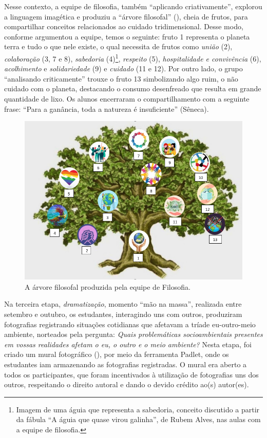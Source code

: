 Nesse contexto, a equipe de filosofia, também “aplicando criativamente”, explorou a linguagem imagética e produziu a “árvore filosofal” (), cheia de frutos, para compartilhar conceitos relacionados ao cuidado tridimensional. Desse modo, conforme argumentou a equipe, temos o seguinte: fruto 1 representa o planeta terra e tudo o que nele existe, o qual necessita de frutos como \textit{união} (2), \textit{colaboração} (3, 7 e 8), \textit{sabedoria} (4)\footnote{ Imagem de uma águia que representa a sabedoria, conceito discutido a partir da fábula “A águia que quase virou galinha”, de Rubem Alves, nas aulas com a equipe de filosofia.}, \textit{respeito} (5), \textit{hospitalidade e convivência} (6), \textit{acolhimento} e \textit{solidariedade} (9) e \textit{cuidado} (11 e 12). Por outro lado, o grupo “analisando criticamente” trouxe o fruto 13 simbolizando algo ruim, o não cuidado com o planeta, destacando o consumo desenfreado que resulta em grande quantidade de lixo. Os alunos encerraram o compartilhamento com a seguinte frase: “Para a ganância, toda a natureza é insuficiente” (Sêneca).  


\begin{figure}[htbp]
\centering
\begin{minipage}{.9\textwidth}
\includegraphics[width=\textwidth]{figure03.png}
\caption{A árvore filosofal produzida pela equipe de Filosofia.}\label{fig-03}
\end{minipage}
\end{figure}
 

Na terceira etapa, \textit{dramatização}, momento “mão na massa”, realizada entre setembro e outubro, os estudantes, interagindo uns com outros, produziram fotografias registrando situações cotidianas que afetavam a tríade eu-outro-meio ambiente, norteados pela pergunta: \textit{Quais problemáticas socioambientais presentes em vossas realidades afetam o eu, o outro e o meio ambiente?} Nesta etapa, foi criado um mural fotográfico (), por meio da ferramenta Padlet, onde os estudantes iam armazenando as fotografias registradas. O mural era aberto a todos os participantes, que foram incentivados à utilização de fotografias uns dos outros, respeitando o direito autoral e dando o devido crédito ao(s) autor(es).

